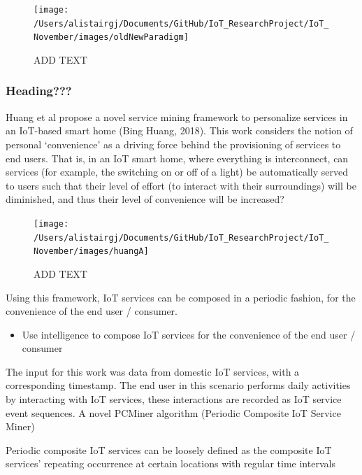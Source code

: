 \documentclass[11pt,]{article}
\providecommand{\tightlist}{%
  \setlength{\itemsep}{0pt}\setlength{\parskip}{0pt}}
\begin{document}
\begin{figure}[H]

{\centering \texttt{[image: /Users/alistairgj/Documents/GitHub/IoT\_ResearchProject/IoT\_November/images/oldNewParadigm]} 

}

\caption{ADD TEXT}\label{fig:unnamed-chunk-6}
\end{figure}

\hypertarget{heading}{%
\subsubsection{Heading???}\label{heading}}

Huang et al propose a novel service mining framework to personalize
services in an IoT-based smart home (Bing Huang, 2018). This work
considers the notion of personal `convenience' as a driving force behind
the provisioning of services to end users. That is, in an IoT smart
home, where everything is interconnect, can services (for example, the
switching on or off of a light) be automatically served to users such
that their level of effort (to interact with their surroundings) will be
diminished, and thus their level of convenience will be increased?

\begin{figure}[H]

{\centering \texttt{[image: /Users/alistairgj/Documents/GitHub/IoT\_ResearchProject/IoT\_November/images/huangA]} 

}

\caption{ADD TEXT}\label{fig:unnamed-chunk-7}
\end{figure}

Using this framework, IoT services can be composed in a periodic
fashion, for the convenience of the end user / consumer.

\begin{itemize}
\tightlist
\item
  Use intelligence to compose IoT services for the convenience of the
  end user / consumer
\end{itemize}

The input for this work was data from domestic IoT services, with a
corresponding timestamp. The end user in this scenario performs daily
activities by interacting with IoT services, these interactions are
recorded as IoT service event sequences. A novel PCMiner algorithm
(Periodic Composite IoT Service Miner)

Periodic composite IoT services can be loosely defined as the composite
IoT services' repeating occurrence at certain locations with regular
time intervals
\end{document}
